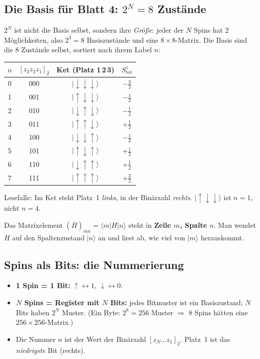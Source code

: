 \documentclass[11pt,a4paper]{article}
\newcommand{\ket}[1]{\lvert #1\rangle}
\newcommand{\bra}[1]{\langle #1\rvert}
\newcommand{\up}{{\uparrow}}
\newcommand{\dn}{{\downarrow}}
\newcommand{\Hbar}{\bar H}
\begin{document}
\subsection{Die Basis für Blatt 4: \texorpdfstring{$2^N = 8$}{2\^N = 8} Zustände}

$2^N$ ist nicht die Basis selbst, sondern ihre \emph{Größe}: jeder der $N$ Spins hat 2 Möglichkeiten, also $2^3 = 8$ Basiszustände und eine $8\times8$-Matrix. Die Basis sind die 8 Zustände selbst, sortiert nach ihrem Label $n$:

\begin{center}
\begin{tabular}{@{}cccc@{}}
\toprule
$n$ & $[z_3z_2z_1]_2$ & Ket (Platz 1\,2\,3) & $S^z_\text{tot}$\\
\midrule
0 & 000 & $\ket{\dn\dn\dn}$ & $-\tfrac32$\\
1 & 001 & $\ket{\up\dn\dn}$ & $-\tfrac12$\\
2 & 010 & $\ket{\dn\up\dn}$ & $-\tfrac12$\\
3 & 011 & $\ket{\up\up\dn}$ & $+\tfrac12$\\
4 & 100 & $\ket{\dn\dn\up}$ & $-\tfrac12$\\
5 & 101 & $\ket{\up\dn\up}$ & $+\tfrac12$\\
6 & 110 & $\ket{\dn\up\up}$ & $+\tfrac12$\\
7 & 111 & $\ket{\up\up\up}$ & $+\tfrac32$\\
\bottomrule
\end{tabular}
\end{center}

\begin{falle}
Lesefalle: Im Ket steht Platz~1 \emph{links}, in der Binärzahl \emph{rechts}. $\ket{\up\dn\dn}$ ist $n=1$, nicht $n=4$.
\end{falle}

Das Matrixelement $(\Hbar)_{mn} = \bra m H\ket n$ steht in \textbf{Zeile $m$, Spalte $n$}. Man wendet $H$ auf den Spaltenzustand $\ket n$ an und liest ab, wie viel von $\ket m$ herauskommt.

\subsection{Spins als Bits: die Nummerierung}

\begin{itemize}[itemsep=2pt]
\item \textbf{1 Spin = 1 Bit:} $\up\leftrightarrow 1$, $\dn\leftrightarrow 0$.
\item \textbf{$N$ Spins = Register mit $N$ Bits:} jedes Bitmuster ist ein Basiszustand; $N$ Bits haben $2^N$ Muster. (Ein Byte: $2^8=256$ Muster $\Rightarrow$ 8 Spins hätten eine $256\times256$-Matrix.)
\item Die Nummer $n$ ist der Wert der Binärzahl $[z_N\dots z_1]_2$. Platz~1 ist das \emph{niedrigste} Bit (rechts).
\end{itemize}
\end{document}
